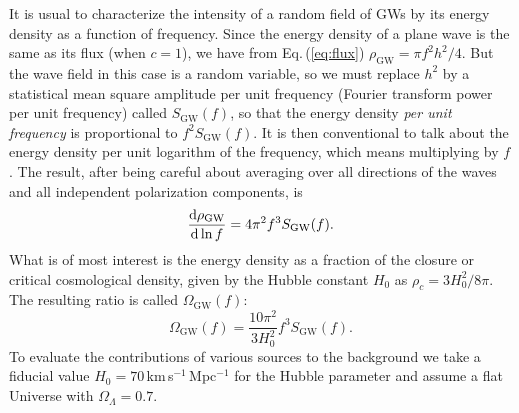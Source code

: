 {
It is usual to characterize the intensity of a random field of 
GWs by its energy density as a function of 
frequency.   Since the energy density of a plane wave is the same 
as its flux (when $c=1$), we have from Eq.\,(\ref{eq:flux})
$\rho_{\text{GW}} = \pi f^2h^2/4.$
But the wave field in this case is a random variable, so we must replace $h^2$ 
by a statistical mean square amplitude per unit frequency 
(Fourier transform power per unit frequency) called $S_{\mathrm{GW}}(f)$, 
so that the energy density \emph{per unit frequency} 
is proportional to $f^2 S_{\mathrm{GW}}(f)$.  It is then conventional to talk about the 
energy density per unit logarithm of the frequency, which means multiplying by $f$.    
The result, after being careful about averaging over all directions of the 
waves and all independent polarization components, is~\cite{Allen:1997ad, Thorne1987}
\begin{equation}
\frac{{\rm d}\rho_{\text{GW}}}{{\rm d}\ln f} = 4\pi^2 f^3 S_{\mathrm{GW}}(f).
\end{equation}
What is of most interest is the energy density as a fraction of the 
closure or critical cosmological density, given by the Hubble constant 
$H_0$ as $\rho_c = 3H_0^2/8\pi$.  The resulting ratio is called $\Omega_{\text{GW}}(f)$:
\begin{equation}
\Omega_{\text{GW}}(f) = \frac{10\pi^2}{3H_0^2}f^3S_{\mathrm{GW}}(f).
\label{eq:stochastic}
\end{equation}
To evaluate the contributions of various sources to the background we 
take a fiducial value $H_0=70$\,km\,s$^{-1}$\,Mpc$^{-1}$ for the Hubble 
parameter and assume a flat Universe with $\Omega_\Lambda = 0.7$.
}

